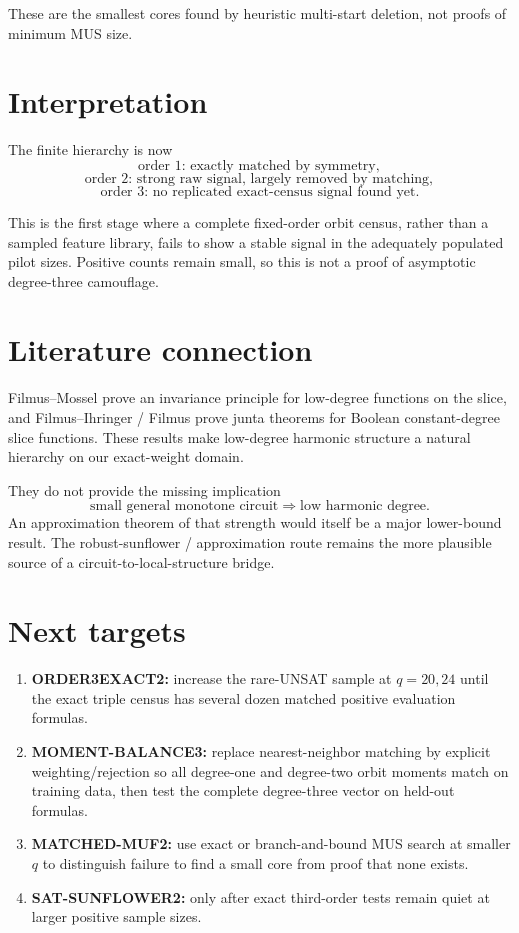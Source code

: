 \documentclass[11pt]{article}
\begin{document}
These are the smallest cores found by heuristic multi-start deletion, not proofs of minimum MUS size.

\section{Interpretation}
The finite hierarchy is now
\[
\boxed{\text{order 1: exactly matched by symmetry}},
\]
\[
\boxed{\text{order 2: strong raw signal, largely removed by matching}},
\]
\[
\boxed{\text{order 3: no replicated exact-census signal found yet}}.
\]

This is the first stage where a complete fixed-order orbit census, rather than a sampled feature library, fails to show a stable signal in the adequately populated pilot sizes. Positive counts remain small, so this is not a proof of asymptotic degree-three camouflage.

\section{Literature connection}
Filmus--Mossel prove an invariance principle for low-degree functions on the slice, and Filmus--Ihringer / Filmus prove junta theorems for Boolean constant-degree slice functions. These results make low-degree harmonic structure a natural hierarchy on our exact-weight domain.

They do not provide the missing implication
\[
\text{small general monotone circuit}
\Longrightarrow
\text{low harmonic degree}.
\]
An approximation theorem of that strength would itself be a major lower-bound result. The robust-sunflower / approximation route remains the more plausible source of a circuit-to-local-structure bridge.

\section{Next targets}
\begin{enumerate}
\item \textbf{ORDER3EXACT2:} increase the rare-UNSAT sample at \(q=20,24\) until the exact triple census has several dozen matched positive evaluation formulas.
\item \textbf{MOMENT-BALANCE3:} replace nearest-neighbor matching by explicit weighting/rejection so all degree-one and degree-two orbit moments match on training data, then test the complete degree-three vector on held-out formulas.
\item \textbf{MATCHED-MUF2:} use exact or branch-and-bound MUS search at smaller \(q\) to distinguish failure to find a small core from proof that none exists.
\item \textbf{SAT-SUNFLOWER2:} only after exact third-order tests remain quiet at larger positive sample sizes.
\end{enumerate}
\end{document}
